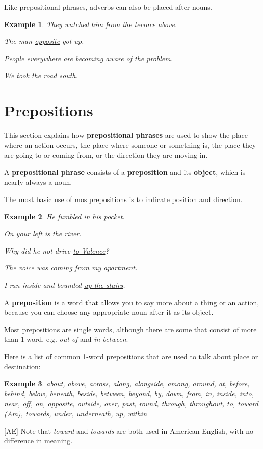 \documentclass[oneside]{book}
\numberwithin{equation}{section}
\newtheorem{example}{Example}[section]
\begin{document}
%
\noindent{} Like prepositional phrases, adverbs can also be placed after nouns.
\begin{example}
    They watched him from the terrace \underline{above}.
    
    The man \underline{opposite} got up.
    
    People \underline{everywhere} are becoming aware of the problem.
    
    We took the road \underline{south}.
\end{example}

\section{Prepositions}
\noindent{} This section explains how \textbf{prepositional phrases} are used to show the place where an action occurs, the place where someone or something is, the place they are going to or coming from, or the direction they are moving in.

%
A \textbf{prepositional phrase} consists of a \textbf{preposition} and its \textbf{object}, which is nearly always a noun.

%
The most basic use of mos prepositions is to indicate position and direction.
\begin{example}
    He fumbled \underline{in his pocket}.
    
    \underline{On your left} is the river.
    
    Why did he not drive \underline{to Valence}?
    
    The voice was coming \underline{from my apartment}.
    
    I ran inside and bounded \underline{up the stairs}.
\end{example}
%
\noindent{} A \textbf{preposition} is a word that allows you to say more about a thing or an action, because you can choose any appropriate noun after it as its object.

Most prepositions are single words, although there are some that consist of more than 1 word, e.g. \textit{out of} and \textit{in between}.

%
Here is a list of common 1-word prepositions that are used to talk about place or destination:
\begin{example}
    about, above, across, along, alongside, among, around, at, before, behind, below, beneath, beside, between, beyond, by, down, from, in, inside, into, near, off, on, opposite, outside, over, past, round, through, throughout, to, toward \emph{(Am)}, towards, under, underneath, up, within
\end{example}
%
[AE] Note that \textit{toward} and \textit{towards} are both used in American English, with no difference in meaning.
\end{document}
